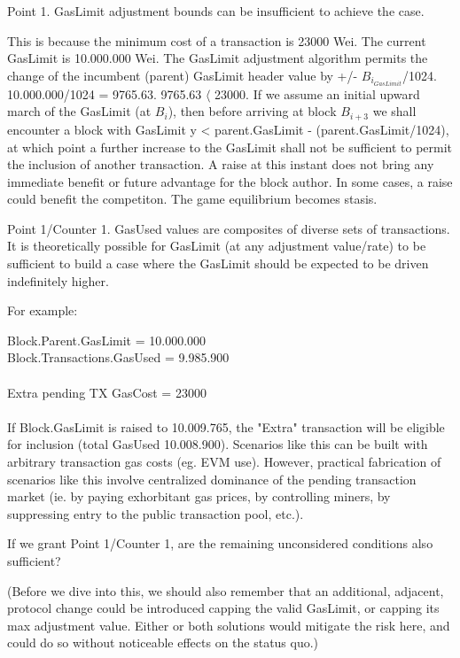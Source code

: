 \documentclass[11pt]{article}
\theoremstyle{plain}
\begin{document}
{Point 1. GasLimit adjustment bounds can be insufficient to achieve the case.

This is because the minimum cost of a transaction is 23000 Wei.
The current GasLimit is 10.000.000 Wei.
The GasLimit adjustment algorithm permits the change of the incumbent (parent)
GasLimit header value by +/- $B_{i}_{GasLimit}$/1024.
10.000.000/1024 = 9765.63.
9765.63 $\langle$ 23000.
If we assume an initial upward march of the GasLimit (at $B_{i}$), then before
arriving at block $B_{i+3}$ we shall encounter a
block with GasLimit y < parent.GasLimit - (parent.GasLimit/1024), at which
point a further increase to the GasLimit
shall not be sufficient to permit the inclusion of another transaction.
A raise at this instant does not bring any immediate benefit or future
advantage for the block author. In some cases, a raise could benefit the
competiton.
The game equilibrium becomes stasis.

Point 1/Counter 1. GasUsed values are composites of diverse sets of
transactions. It is theoretically possible for GasLimit (at any adjustment
value/rate) to be sufficient to build a case where
the GasLimit should be expected to be driven indefinitely higher. 

For example:

Block.Parent.GasLimit     = 10.000.000 \\
Block.Transactions.GasUsed = 9.985.900 \\
\\
Extra pending TX GasCost = 23000 \\
\\
If Block.GasLimit is raised to 10.009.765, the "Extra" transaction will be
eligible for inclusion (total GasUsed 10.008.900).
Scenarios like this can be built with arbitrary transaction gas costs (eg. EVM
use).
However, practical fabrication of scenarios like this involve centralized
dominance of the pending transaction market (ie. by paying exhorbitant gas
prices, by controlling miners, by suppressing entry to the public transaction
pool, etc.).

If we grant Point 1/Counter 1, are the remaining unconsidered conditions also
sufficient?

(Before we dive into this, we should also remember that an additional,
adjacent, protocol change could be introduced capping the valid GasLimit, or
capping its max adjustment value. Either or both solutions would mitigate the
risk here, and could do so without noticeable effects on the status quo.)

}
\end{document}
